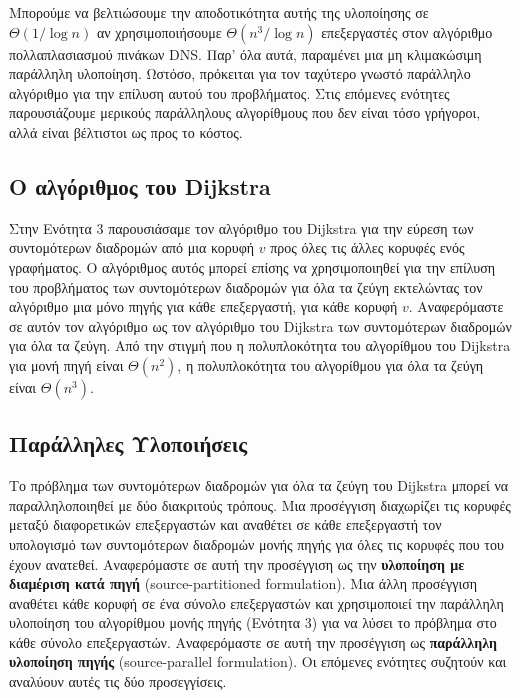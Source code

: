 \documentclass[12pt,a4paper]{article}
\begin{document}
Μπορούμε να βελτιώσουμε την αποδοτικότητα αυτής της υλοποίησης σε $\Theta(1/\log n)$ αν χρησιμοποιήσουμε $\Theta(n^{3}/\log n)$ επεξεργαστές στον αλγόριθμο πολλαπλασιασμού πινάκων \foreignlanguage{english}{DNS}. Παρ' όλα αυτά, παραμένει μια μη κλιμακώσιμη παράλληλη υλοποίηση. Ωστόσο, πρόκειται για τον ταχύτερο γνωστό παράλληλο αλγόριθμο για την επίλυση αυτού του προβλήματος. Στις επόμενες ενότητες παρουσιάζουμε μερικούς παράλληλους αλγορίθμους που δεν είναι τόσο γρήγοροι, αλλά είναι βέλτιστοι ως προς το κόστος.

\subsection{Ο αλγόριθμος του \foreignlanguage{english}{Dijkstra}}
Στην Ενότητα 3 παρουσιάσαμε τον αλγόριθμο του \foreignlanguage{english}{Dijkstra} για την εύρεση των συντομότερων διαδρομών από μια κορυφή $v$ προς όλες τις άλλες κορυφές ενός γραφήματος. Ο αλγόριθμος αυτός μπορεί επίσης να χρησιμοποιηθεί για την επίλυση του προβλήματος των συντομότερων διαδρομών για όλα τα ζεύγη εκτελώντας τον αλγόριθμο μια μόνο πηγής για κάθε επεξεργαστή, για κάθε κορυφή $v$. Αναφερόμαστε σε αυτόν τον αλγόριθμο ως τον αλγόριθμο του \foreignlanguage{english}{Dijkstra} των συντομότερων διαδρομών για όλα τα ζεύγη. Από την στιγμή που η πολυπλοκότητα του αλγορίθμου του \foreignlanguage{english}{Dijkstra} για μονή πηγή είναι $\Theta(n^2)$, η πολυπλοκότητα του αλγορίθμου για όλα τα ζεύγη είναι $\Theta(n^3)$.

\subsection*{Παράλληλες Υλοποιήσεις}
Το πρόβλημα των συντομότερων διαδρομών για όλα τα ζεύγη του \foreignlanguage{english}{Dijkstra} μπορεί να παραλληλοποιηθεί με δύο διακριτούς τρόπους. Μια προσέγγιση διαχωρίζει τις κορυφές μεταξύ διαφορετικών επεξεργαστών και αναθέτει σε κάθε επεξεργαστή τον υπολογισμό των συντομότερων διαδρομών μονής πηγής για όλες τις κορυφές που του έχουν ανατεθεί. Αναφερόμαστε σε αυτή την προσέγγιση ως την \textbf{υλοποίηση με διαμέριση κατά πηγή} (\foreignlanguage{english}{source-partitioned formulation}). Μια άλλη προσέγγιση αναθέτει κάθε κορυφή σε ένα σύνολο επεξεργαστών και χρησιμοποιεί την παράλληλη υλοποίηση του αλγορίθμου μονής πηγής (Ενότητα 3) για να λύσει το πρόβλημα στο κάθε σύνολο επεξεργαστών. Αναφερόμαστε σε αυτή την προσέγγιση ως \textbf{παράλληλη υλοποίηση πηγής} (\foreignlanguage{english}{source-parallel formulation}). Οι επόμενες ενότητες συζητούν και αναλύουν αυτές τις δύο προσεγγίσεις.
\end{document}
